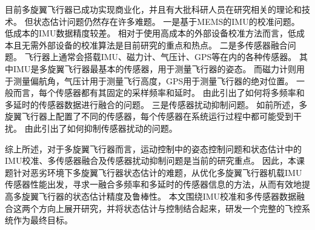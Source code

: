 \documentclass[
  type=master
]{gdutthesis}
\begin{document}
目前多旋翼飞行器已成功实现商业化，并且有大批科研人员在研究相关的理论和技术\cite{李一博2019微小型飞行器视觉感知与自主导航关键技术研究,cao2015inner,mechali2022fixed}。
但状态估计问题仍然存在许多难题。
一是基于MEMS的IMU的校准问题。
低成本的IMU数据精度较差。
相对于使用高成本的外部设备校准方法而言，低成本且无需外部设备的校准算法是目前研究的重点和热点。
二是多传感器融合问题。
飞行器上通常会搭载IMU、磁力计、气压计、GPS等在内的各种传感器。
其中IMU是多旋翼飞行器最基本的传感器，用于测量飞行器的姿态。
而磁力计则用于测量偏航角，气压计用于测量飞行高度，GPS用于测量飞行器的绝对位置。
一般而言，每个传感器都有其固定的采样频率和延时。
由此引出了如何将多频率和多延时的传感器数据进行融合的问题。
三是传感器扰动抑制问题。
如前所述，多旋翼飞行器上配置了不同的传感器，每个传感器在系统运行过程中都可能受到干扰。
由此引出了如何抑制传感器扰动的问题。

综上所述，对于多旋翼飞行器而言，运动控制中的姿态控制问题和状态估计中的IMU校准、多传感器融合及传感器扰动抑制问题是当前的研究重点。
因此，本课题针对恶劣环境下多旋翼飞行器状态估计的难题，从优化多旋翼飞行器机载IMU传感器性能出发，寻求一融合多频率和多延时的传感器信息的方法，从而有效地提高多旋翼飞行器的状态估计精度及鲁棒性。
本文围绕IMU校准和多传感器数据融合这两个方向上展开研究，并将状态估计与控制结合起来，研发一个完整的飞控系统作为最终目标。



%
\end{document}
